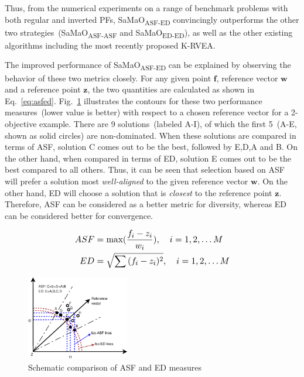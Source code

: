 \documentclass[twocolumn,10pt]{asme2ej}
\begin{document}
Thus, from the numerical experiments on a range of benchmark problems with both regular and inverted PFs, SaMaO\textsubscript{ASF-ED} convincingly outperforms the other two strategies~(SaMaO\textsubscript{ASF-ASF} and SaMaO\textsubscript{ED-ED}), as well as the other existing algorithms including the most recently proposed K-RVEA. 

The improved performance of SaMaO\textsubscript{ASF-ED} can be explained by observing the behavior of these two metrics closely. For any given point $\mathbf{f}$, reference vector $\mathbf{w}$ and a reference point $\mathbf{z}$, the two quantities are calculated as shown in Eq.~\ref{eq:asfed}. Fig.~\ref{fig:compareasfed} illustrates the contours for these two performance measures~(lower value is better) with respect to a chosen reference vector for a 2-objective example. There are 9 solutions~(labeled A-I), of which the first 5~(A-E, shown as solid circles) are non-dominated. When these solutions are compared in terms of ASF, solution C comes out to be the best, followed by E,D,A and B. On the other hand, when compared in terms of ED, solution E comes out to be the best compared to all others. Thus, it can be seen that selection based on ASF will prefer a solution most \emph{well-aligned} to the given reference vector $\mathbf{w}$. On the other hand, ED will choose a solution that is \emph{closest} to the reference point $\mathbf{z}$. Therefore, ASF can be considered as a better metric for diversity, whereas ED can be considered better for convergence. 

\begin{equation}\footnotesize
\begin{aligned}
ASF & = \text{max}(\frac{f_i-z_i}{w_i}), \quad i=1,2,\ldots M\\
ED & = \sqrt{\sum{(f_i-z_i)^2}}, \quad i=1,2,\ldots M\\
\end{aligned}
\label{eq:asfed}
\end{equation}

\begin{figure}[!htb]
	\centering    
	\includegraphics[width = 0.4\textwidth]{figures/asfed.eps}   
	\caption{Schematic comparison of ASF and ED measures}
	\label{fig:compareasfed}
\end{figure}
\end{document}
